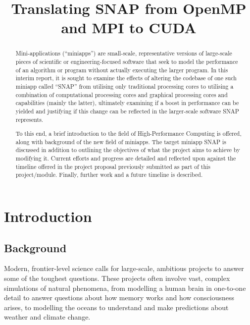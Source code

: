 \documentclass[conference]{IEEEtran}
\begin{document}
\title{Translating SNAP from OpenMP and MPI to CUDA}

\author{
}

\maketitle


\begin{abstract}

Mini-applications (``miniapps'') are small-scale, representative versions of large-scale pieces of scientific or engineering-focused software that seek to model the performance of an algorithm or program without actually executing the larger program. In this interim report, it is sought to examine the effects of altering the codebase of one such miniapp called ``SNAP'' from utilising only traditional processing cores to utilising a combination of computational processing cores and graphical processing cores and capabilities (mainly the latter), ultimately examining if a boost in performance can be yielded and justifying if this change can be reflected in the larger-scale software SNAP represents.

To this end, a brief introduction to the field of High-Performance Computing is offered, along with background of the new field of miniapps. The target miniapp SNAP is discussed in addition to outlining the objectives of what the project aims to achieve by modifying it. Current efforts and progress are detailed and reflected upon against the timeline offered in the project proposal previously submitted as part of this project/module. Finally, further work and a future timeline is described.

\end{abstract}


\section{Introduction}

\subsection{Background}

Modern, frontier-level science calls for large-scale, ambitious projects to answer some of the toughest questions. These projects often involve vast, complex simulations of natural phenomena, from modelling a human brain in one-to-one detail to answer questions about how memory works and how consciousness arises, to modelling the oceans to understand and make predictions about weather and climate change.
\end{document}

